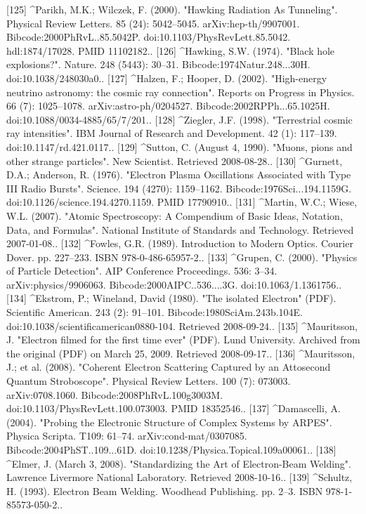 [125]
^Parikh, M.K.; Wilczek, F. (2000). "Hawking Radiation As Tunneling". Physical Review Letters. 85 (24): 5042–5045. arXiv:hep-th/9907001. Bibcode:2000PhRvL..85.5042P. doi:10.1103/PhysRevLett.85.5042. hdl:1874/17028. PMID 11102182..
[126]
^Hawking, S.W. (1974). "Black hole explosions?". Nature. 248 (5443): 30–31. Bibcode:1974Natur.248...30H. doi:10.1038/248030a0..
[127]
^Halzen, F.; Hooper, D. (2002). "High-energy neutrino astronomy: the cosmic ray connection". Reports on Progress in Physics. 66 (7): 1025–1078. arXiv:astro-ph/0204527. Bibcode:2002RPPh...65.1025H. doi:10.1088/0034-4885/65/7/201..
[128]
^Ziegler, J.F. (1998). "Terrestrial cosmic ray intensities". IBM Journal of Research and Development. 42 (1): 117–139. doi:10.1147/rd.421.0117..
[129]
^Sutton, C. (August 4, 1990). "Muons, pions and other strange particles". New Scientist. Retrieved 2008-08-28..
[130]
^Gurnett, D.A.; Anderson, R. (1976). "Electron Plasma Oscillations Associated with Type III Radio Bursts". Science. 194 (4270): 1159–1162. Bibcode:1976Sci...194.1159G. doi:10.1126/science.194.4270.1159. PMID 17790910..
[131]
^Martin, W.C.; Wiese, W.L. (2007). "Atomic Spectroscopy: A Compendium of Basic Ideas, Notation, Data, and Formulas". National Institute of Standards and Technology. Retrieved 2007-01-08..
[132]
^Fowles, G.R. (1989). Introduction to Modern Optics. Courier Dover. pp. 227–233. ISBN 978-0-486-65957-2..
[133]
^Grupen, C. (2000). "Physics of Particle Detection". AIP Conference Proceedings. 536: 3–34. arXiv:physics/9906063. Bibcode:2000AIPC..536....3G. doi:10.1063/1.1361756..
[134]
^Ekstrom, P.; Wineland, David (1980). "The isolated Electron" (PDF). Scientific American. 243 (2): 91–101. Bibcode:1980SciAm.243b.104E. doi:10.1038/scientificamerican0880-104. Retrieved 2008-09-24..
[135]
^Mauritsson, J. "Electron filmed for the first time ever" (PDF). Lund University. Archived from the original (PDF) on March 25, 2009. Retrieved 2008-09-17..
[136]
^Mauritsson, J.; et al. (2008). "Coherent Electron Scattering Captured by an Attosecond Quantum Stroboscope". Physical Review Letters. 100 (7): 073003. arXiv:0708.1060. Bibcode:2008PhRvL.100g3003M. doi:10.1103/PhysRevLett.100.073003. PMID 18352546..
[137]
^Damascelli, A. (2004). "Probing the Electronic Structure of Complex Systems by ARPES". Physica Scripta. T109: 61–74. arXiv:cond-mat/0307085. Bibcode:2004PhST..109...61D. doi:10.1238/Physica.Topical.109a00061..
[138]
^Elmer, J. (March 3, 2008). "Standardizing the Art of Electron-Beam Welding". Lawrence Livermore National Laboratory. Retrieved 2008-10-16..
[139]
^Schultz, H. (1993). Electron Beam Welding. Woodhead Publishing. pp. 2–3. ISBN 978-1-85573-050-2..
